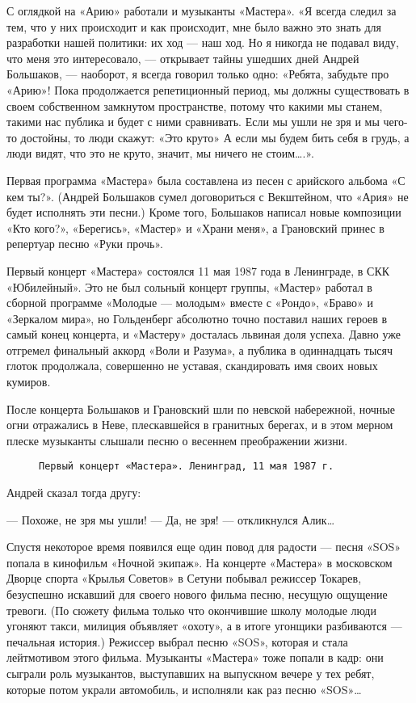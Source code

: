 С оглядкой на «Арию» работали и музыканты «Мастера». «Я всегда следил за тем, что у них происходит и как происходит, мне
было важно это знать для разработки нашей политики: их ход — наш ход. Но я никогда не подавал виду, что меня это
интересовало, — открывает тайны ушедших дней Андрей Большаков, — наоборот, я всегда говорил только одно: «Ребята,
забудьте про «Арию»! Пока продолжается репетиционный период, мы должны существовать в своем собственном замкнутом
пространстве, потому что какими мы станем, такими нас публика и будет с ними сравнивать. Если мы ушли не зря и мы
чего-то достойны, то люди скажут: «Это круто» А если мы будем бить себя в грудь, а люди видят, что это не круто, значит,
мы ничего не стоим\ldots.».

Первая программа «Мастера» была составлена из песен с арийского альбома «С кем ты?». (Андрей Большаков сумел
договориться с Векштейном, что «Ария» не будет исполнять эти песни.) Кроме того, Большаков написал новые композиции
«Кто кого?», «Берегись», «Мастер» и «Храни меня», а Грановский принес в репертуар песню «Руки прочь».

Первый концерт «Мастера» состоялся 11 мая 1987 года в Ленинграде, в СКК «Юбилейный». Это не был сольный концерт группы,
«Мастер» работал в сборной программе «Молодые — молодым» вместе с «Рондо», «Браво» и «Зеркалом мира», но Гольденберг
абсолютно точно поставил наших героев в самый конец концерта, и «Мастеру» досталась львиная доля успеха. Давно уже
отгремел финальный аккорд «Воли и Разума», а публика в одиннадцать тысяч глоток продолжала, совершенно не уставая,
скандировать имя своих новых кумиров.

После концерта Большаков и Грановский шли по невской набережной, ночные огни отражались в Неве, плескавшейся в гранитных
берегах, и в этом мерном плеске музыканты слышали песню о весеннем преображении жизни.

\begin{figure}[h]
    \centering
    \caption{\texttt{Первый концерт «Мастера». Ленинград, 11 мая 1987 г.}}
\end{figure}

Андрей сказал тогда другу:

— Похоже, не зря мы ушли!
— Да, не зря! — откликнулся Алик\ldots

Спустя некоторое время появился еще один повод для радости — песня «SOS» попала в кинофильм «Ночной экипаж». На концерте
«Мастера» в московском Дворце спорта «Крылья Советов» в Сетуни побывал режиссер Токарев, безуспешно искавший для своего
нового фильма песню, несущую ощущение тревоги. (По сюжету фильма только что окончившие школу молодые люди угоняют такси,
милиция объявляет «охоту», а в итоге угонщики разбиваются — печальная история.) Режиссер выбрал песню «SOS», которая и
стала лейтмотивом этого фильма. Музыканты «Мастера» тоже попали в кадр: они сыграли роль музыкантов, выступавших на
выпускном вечере у тех ребят, которые потом украли автомобиль, и исполняли как раз песню «SOS»\ldots

